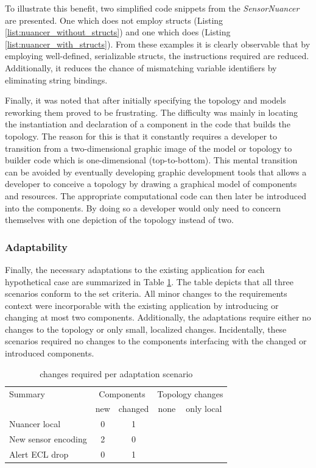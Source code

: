 To illustrate this benefit, two simplified code snippets from the \emph{SensorNuancer} are presented. One which does not employ structs (Listing \ref{list:nuancer_without_structs}) and one which does (Listing \ref{list:nuancer_with_structs}). From these examples it is clearly observable that by employing well-defined, serializable structs, the instructions required are reduced. Additionally, it reduces the chance of mismatching variable identifiers by eliminating string bindings.



Finally, it was noted that after initially specifying the topology and models reworking them proved to be frustrating. The difficulty was mainly in locating the instantiation and declaration of a component in the code that builds the topology. The reason for this is that it constantly requires a developer to transition from a two-dimensional graphic image of the model or topology to builder code which is one-dimensional (top-to-bottom). This mental transition can be avoided by eventually developing  graphic development tools that allows a developer to conceive a topology by drawing a graphical model of components and resources. The appropriate computational code can then later be introduced into the components. By doing so a developer would only need to concern themselves with one depiction of the topology instead of two.

\subsubsection{Adaptability}
Finally, the necessary adaptations to the existing application for each hypothetical case are summarized in Table \ref{table:adaptations}. The table depicts that all three scenarios conform to the set criteria. All minor changes to the requirements context were incorporable with the existing application by introducing or changing at most two components. Additionally, the adaptations require either no changes to the topology or only small, localized changes. Incidentally, these scenarios required no changes to the components interfacing with the changed or introduced components.

\begin{table}
\centering
\begin{tabular}{|l||c|c||c|c|} \hline
Summary				& \multicolumn{2}{c||}{Components}		& \multicolumn{2}{c|}{Topology changes} \\ 
					& new 	& changed 	& none 		& only local  \\ \hline 
Nuancer local		& 0		& 1			&			& \cmark \\ \hline
New sensor encoding	& 2		& 0			& 			& \cmark \\ \hline
Alert ECL drop		& 0		& 1			& \cmark	&		 \\ \hline
\end{tabular}
\caption{changes required per adaptation scenario}
\label{table:adaptations}
\end{table}


